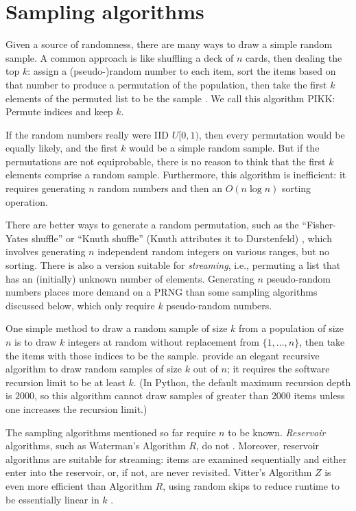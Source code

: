 \documentclass[graybox]{svmult}
\begin{document}
\section{Sampling algorithms}
\label{sec:algorithms}

Given a source of randomness, there are many ways to draw a simple random sample.
A common approach is like shuffling a deck of $n$ cards, then dealing the top $k$:
assign a (pseudo-)random number to each item, sort the items based on that number
to produce a permutation of the population, 
then take the first $k$ elements of the permuted list to be the sample
\cite{stine_statistics_2014, leblanc_statistics_2004, dahlberg_practical_2010}.
We call this algorithm PIKK: Permute indices and keep $k$.

If the random numbers really were IID $U[0,1)$, then every permutation would be equally likely, 
and the first $k$ would be a simple random sample.
But if the permutations are not equiprobable, there is no reason to think that the first $k$ 
elements comprise a random sample. 
Furthermore, this algorithm is inefficient: it requires generating 
$n$ random numbers and then an $O(n\log n)$ sorting operation.

There are better ways to generate a random permutation, such as the ``Fisher-Yates shuffle'' or ``Knuth shuffle'' (Knuth attributes it to Durstenfeld) \cite{knuth_art_1997},
which involves generating $n$ independent random integers on various ranges, but no sorting.
There is also a version suitable for \emph{streaming}, i.e., permuting a list that has an (initially) unknown number of elements.
Generating $n$ pseudo-random numbers places more demand on a PRNG than some sampling algorithms discussed below, which only require $k$ pseudo-random numbers.

One simple method to draw a random sample of size $k$ from a population of size $n$
is to draw $k$ integers at random without replacement from  $\{1, \ldots, n\}$, then take the items with those indices to be the sample.
\cite{cormen_introduction_2009} provide an elegant recursive algorithm to draw random samples of size $k$ out of $n$; it requires the software recursion limit to be at least $k$.
(In Python, the default maximum recursion depth is $2000$, so this algorithm cannot draw samples of greater than $2000$ items unless one increases the recursion limit.)

The sampling algorithms mentioned so far require $n$ to be known.
\emph{Reservoir} algorithms, such as Waterman's Algorithm $R$, do not  \cite{knuth_art_1997}.
Moreover, reservoir algorithms are suitable for streaming: items are examined
sequentially and either enter into the reservoir, or, if not, are never revisited.
Vitter's Algorithm $Z$ is even more efficient than Algorithm $R$,
using random skips to reduce runtime to be essentially linear in $k$ \cite{vitter_random_1985}.
\end{document}
